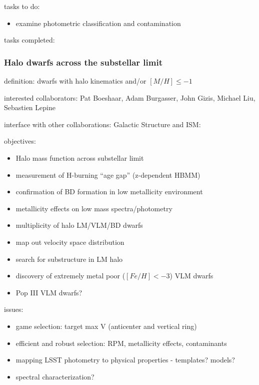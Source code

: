 tasks to do: 
\begin{itemize}
\item{examine 
photometric classification and contamination}
\end{itemize}

tasks completed: 


\subsubsection{Halo dwarfs across the substellar limit}

definition: dwarfs with halo kinematics and/or $[M/H] \le -1$  

interested collaborators: 
Pat Boeshaar,  Adam Burgasser, John Gizis,  Michael Liu,
Sebastien Lepine 

interface with other collaborations: 
Galactic 
Structure and ISM: 

objectives: 
\begin{itemize}
\item{Halo 
mass function across substellar limit}
\item{measurement 
of H-burning “age gap” (z-dependent HBMM)}
\item{confirmation 
of BD formation in low metallicity environment}
\item{metallicity 
effects on low mass spectra/photometry }
\item{multiplicity 
of halo LM/VLM/BD dwarfs }
\item{map 
out velocity space distribution }
\item{search 
for substructure in LM halo }
\item{discovery 
of extremely metal poor ($[Fe/H] < -3$) VLM dwarfs }
\item{Pop 
III VLM dwarfs? }
\end{itemize}

issues: 
\begin{itemize}
\item{game 
selection: target max V (anticenter and vertical ring) }
\item{efficient 
and robust selection: RPM, metallicity effects, contaminants}
\item{mapping 
LSST photometry to physical properties - templates? models?}
\item{spectral 
characterization? }
\end{itemize}

